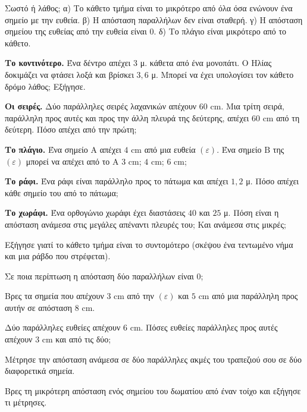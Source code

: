 \ex Σωστό ή λάθος; α) Το κάθετο τμήμα είναι το μικρότερο από όλα όσα ενώνουν ένα σημείο με την ευθεία. \quad β) Η απόσταση παραλλήλων δεν είναι σταθερή. \quad γ) Η απόσταση σημείου της ευθείας από την ευθεία είναι $0$. \quad δ) Το πλάγιο είναι μικρότερο από το κάθετο.


\ex \textbf{Το κοντινότερο.} Ένα δέντρο απέχει $3$ μ. κάθετα από ένα μονοπάτι. Ο Ηλίας δοκιμάζει να φτάσει λοξά και βρίσκει $3{,}6$ μ. Μπορεί να έχει υπολογίσει τον κάθετο δρόμο λάθος; Εξήγησε.

\ex \textbf{Οι σειρές.} Δύο παράλληλες σειρές λαχανικών απέχουν $60$ cm. Μια τρίτη σειρά, παράλληλη προς αυτές και προς την άλλη πλευρά της δεύτερης, απέχει $60$ cm από τη δεύτερη. Πόσο απέχει από την πρώτη;

\ex \textbf{Το πλάγιο.} Ένα σημείο $\mathrm{Α}$ απέχει $4$ cm από μια ευθεία $(\varepsilon)$. Ένα σημείο $\mathrm{Β}$ της $(\varepsilon)$ μπορεί να απέχει από το $\mathrm{Α}$ $3$ cm; $4$ cm; $6$ cm;

\ex \textbf{Το ράφι.} Ένα ράφι είναι παράλληλο προς το πάτωμα και απέχει $1{,}2$ μ. Πόσο απέχει κάθε σημείο του από το πάτωμα;

\ex \textbf{Το χωράφι.} Ένα ορθογώνιο χωράφι έχει διαστάσεις $40$ και $25$ μ. Πόση είναι η απόσταση ανάμεσα στις μεγάλες απέναντι πλευρές του; Και ανάμεσα στις μικρές;


\ex Εξήγησε γιατί το κάθετο τμήμα είναι το συντομότερο (σκέψου ένα τεντωμένο νήμα και μια ράβδο που στρέφεται).

\ex Σε ποια περίπτωση η απόσταση δύο παραλλήλων είναι $0$;

\ex Βρες τα σημεία που απέχουν $3$ cm από την $(\varepsilon)$ και $5$ cm από μια παράλληλη προς αυτήν σε απόσταση $8$ cm.

\ex Δύο παράλληλες ευθείες απέχουν $6$ cm. Πόσες ευθείες παράλληλες προς αυτές απέχουν $3$ cm και από τις δύο;


\ex Μέτρησε την απόσταση ανάμεσα σε δύο παράλληλες ακμές του τραπεζιού σου σε δύο διαφορετικά σημεία.

\ex Βρες τη μικρότερη απόσταση ενός σημείου του δωματίου από έναν τοίχο και εξήγησε τι μέτρησες.
